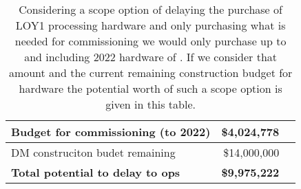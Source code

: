 \tiny \begin{longtable} { |p{}  |r  |r |} 
\caption{Considering a scope option of delaying the purchase of LOY1 processing hardware and only purchasing what is needed for commissioning we would only purchase up to and including 2022 hardware of . If we consider that amount and the current remaining construction budget for hardware the potential worth of such a scope option is given in this table. \label{tab:Scope}}\\ 
\hline 
\textbf{Budget for commissioning (to 2022)}&\textbf{\$4,024,778} \\ \hline
{DM construciton budet remaining}&{\$14,000,000} \\ \hline
\textbf{Total potential to delay to ops }&\textbf{\$9,975,222} \\ \hline
\end{longtable} \normalsize

